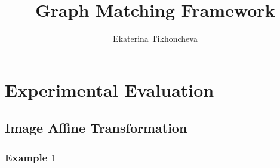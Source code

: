 \documentclass[
	fontsize=12pt,
	paper=a4,
	twoside=false,
	numbers=noenddot,
	plainheadsepline,
	toc=listof,
	toc=bibliography
]{scrartcl}
\begin{document}
\pagestyle{plain}

\title{Graph Matching Framework}
\author{Ekaterina Tikhoncheva}
\date{} 

\maketitle 



\section{Experimental Evaluation}

\subsection{Image Affine Transformation}

\subsubsection{Example $1$}
\end{document}
